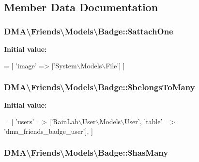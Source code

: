 \subsection{Member Data Documentation}
\hypertarget{classDMA_1_1Friends_1_1Models_1_1Badge_abd4795b249f74dd23651f51479fbe5fb}{
\subsubsection[{\$attach\+One}]{\setlength{\rightskip}{0pt plus 5cm}D\+M\+A\textbackslash{}\+Friends\textbackslash{}\+Models\textbackslash{}\+Badge\+::\$attach\+One}}\label{classDMA_1_1Friends_1_1Models_1_1Badge_abd4795b249f74dd23651f51479fbe5fb}
{\bfseries Initial value\+:}
\begin{DoxyCode}
= [
        \textcolor{stringliteral}{'image'} => [\textcolor{stringliteral}{'System\(\backslash\)Models\(\backslash\)File'}]
    ]
\end{DoxyCode}
\hypertarget{classDMA_1_1Friends_1_1Models_1_1Badge_ab143958e8f63d5b612832fee145f0aa1}{
\subsubsection[{\$belongs\+To\+Many}]{\setlength{\rightskip}{0pt plus 5cm}D\+M\+A\textbackslash{}\+Friends\textbackslash{}\+Models\textbackslash{}\+Badge\+::\$belongs\+To\+Many}}\label{classDMA_1_1Friends_1_1Models_1_1Badge_ab143958e8f63d5b612832fee145f0aa1}
{\bfseries Initial value\+:}
\begin{DoxyCode}
= [
        \textcolor{stringliteral}{'users'} => [\textcolor{stringliteral}{'RainLab\(\backslash\)User\(\backslash\)Models\(\backslash\)User'}, \textcolor{stringliteral}{'table'} => \textcolor{stringliteral}{'dma\_friends\_badge\_user'}],
    ]
\end{DoxyCode}
\hypertarget{classDMA_1_1Friends_1_1Models_1_1Badge_a1b363de2d8c44cd12dff6bca90a6b212}{
\subsubsection[{\$has\+Many}]{\setlength{\rightskip}{0pt plus 5cm}D\+M\+A\textbackslash{}\+Friends\textbackslash{}\+Models\textbackslash{}\+Badge\+::\$has\+Many}}\label{classDMA_1_1Friends_1_1Models_1_1Badge_a1b363de2d8c44cd12dff6bca90a6b212}
